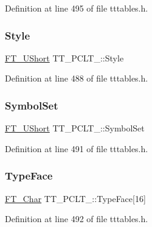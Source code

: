 Definition at line 495 of file tttables.\+h.

\mbox{\label{struct_t_t___p_c_l_t___a8e99588c1d255e28aa3c59600d5ae7bd}} 
\subsubsection{\texorpdfstring{Style}{Style}}
{\footnotesize\ttfamily \mbox{\hyperlink{fttypes_8h_a937f6c17cf5ffd09086d8610c37b9f58}{F\+T\+\_\+\+U\+Short}} T\+T\+\_\+\+P\+C\+L\+T\+\_\+\+::\+Style}



Definition at line 488 of file tttables.\+h.

\mbox{\label{struct_t_t___p_c_l_t___ad4eeb575ecd624d4540275981e96a336}} 
\subsubsection{\texorpdfstring{SymbolSet}{SymbolSet}}
{\footnotesize\ttfamily \mbox{\hyperlink{fttypes_8h_a937f6c17cf5ffd09086d8610c37b9f58}{F\+T\+\_\+\+U\+Short}} T\+T\+\_\+\+P\+C\+L\+T\+\_\+\+::\+Symbol\+Set}



Definition at line 491 of file tttables.\+h.

\mbox{\label{struct_t_t___p_c_l_t___a47c2c6b276f3ab2002fe03af41dad396}} 
\subsubsection{\texorpdfstring{TypeFace}{TypeFace}}
{\footnotesize\ttfamily \mbox{\hyperlink{fttypes_8h_a0f851552b050883885f0a0855771f39d}{F\+T\+\_\+\+Char}} T\+T\+\_\+\+P\+C\+L\+T\+\_\+\+::\+Type\+Face\mbox{[}16\mbox{]}}



Definition at line 492 of file tttables.\+h.

\mbox{\label{struct_t_t___p_c_l_t___a9bb9ac1b782e03002ecb99de08af7935}} 
